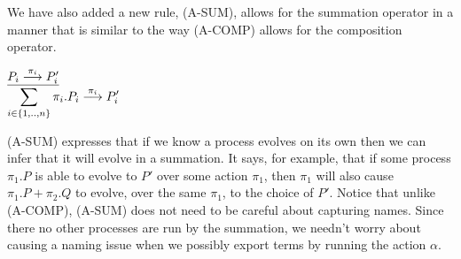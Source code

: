 We have also added a new rule, (A-SUM), allows for the summation operator in a manner that is similar to the way (A-COMP) allows for the composition operator.
\begin{center}
	$\underline{P_i \overset{{\pi_i}}{\longrightarrow} P_i'}$\\
	$\displaystyle\sum_{i\in \{1,..,n\}}\pi_i.P_i \overset{{\pi_i}}{\longrightarrow} P_i'$\\
\end{center}
(A-SUM) expresses that if we know a process evolves on its own then we can infer that it will evolve in a summation.  It says, for example, that if some process $\pi_1.P$ is able to evolve to $P'$ over some action $\pi_1$, then $\pi_1$ will also cause $\pi_1.P+\pi_2.Q$ to evolve, over the same $\pi_1$, to the choice of $P'$.
Notice that unlike (A-COMP), (A-SUM) does not need to be careful about capturing names. 
Since there no other processes are run by the summation, we needn't worry about causing a naming issue when we possibly export terms by running the action $\alpha$.

